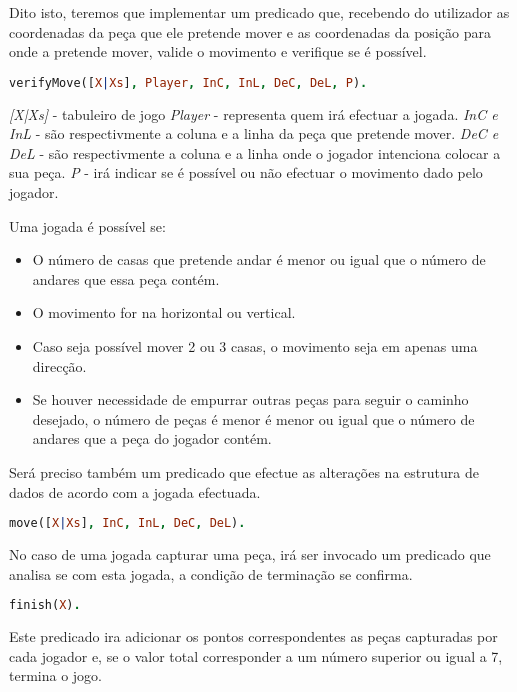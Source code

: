 \documentclass[a4paper]{article}
\begin{document}
Dito isto, teremos que implementar um predicado que, recebendo do utilizador as coordenadas da peça que ele pretende mover e as coordenadas da posição para onde a pretende mover, valide o movimento e verifique se é possível.
\bigskip
\begin{lstlisting}[language=Prolog]
verifyMove([X|Xs], Player, InC, InL, DeC, DeL, P).
\end{lstlisting}
\bigskip

\noindent 
\textit{[X|Xs]} - tabuleiro de jogo
\noindent
\textit{Player} - representa quem irá efectuar a jogada.
\newline
\textit{InC e InL} - são respectivmente a coluna e a linha da peça que pretende mover.
\newline
\textit{DeC e DeL} - são respectivmente a coluna e a linha onde o jogador intenciona colocar a sua peça.
\newline
\textit{P} - irá indicar se é possível ou não efectuar o movimento dado pelo jogador.
\bigskip

Uma jogada é possível se:
\begin{itemize}
	\item O número de casas que pretende andar é menor ou igual que o número de andares que essa peça contém.
	\item O movimento for na horizontal ou vertical.
	\item Caso seja possível mover 2 ou 3 casas, o movimento seja em apenas uma direcção.
	\item Se houver necessidade de empurrar outras peças para seguir o caminho desejado, o número de peças é menor é menor ou igual que o número de andares que a peça do jogador contém.
	
\end{itemize}
\bigskip

Será preciso também um predicado que efectue as alterações na estrutura de dados de acordo com a jogada efectuada.
\bigskip
\begin{lstlisting}[language=Prolog]
move([X|Xs], InC, InL, DeC, DeL).
\end{lstlisting}
\bigskip

No caso de uma jogada capturar uma peça, irá ser invocado um predicado que analisa se com esta jogada, a condição de terminação se confirma.
\bigskip
\begin{lstlisting}[language=Prolog]
finish(X).
\end{lstlisting}
\bigskip
\newline
Este predicado ira adicionar os pontos correspondentes as peças capturadas por cada jogador e, se o valor total corresponder a um número superior ou igual a 7, termina o jogo.
\bigskip
\end{document}
